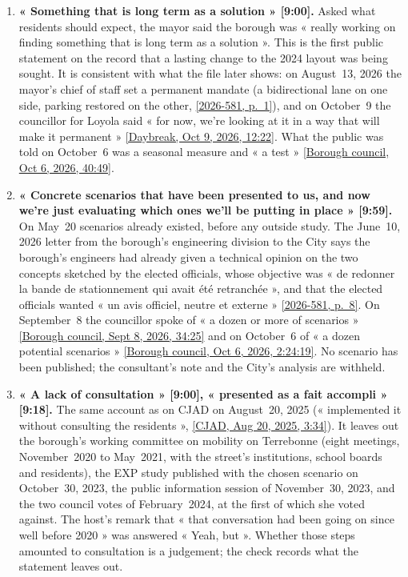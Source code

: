 \documentclass[11pt,letterpaper]{article}
\newcommand{\repourl}{https://github.com/OpenMobilityData/Terrebonne-open-sources}
\newcommand{\pagesurl}{https://openmobilitydata.github.io/Terrebonne-access-requests}
\newcommand{\cliptime}[1]{\textsf{\small[#1]}}
\newcommand{\pgl}[2]{\href{\pagesurl/2026-581/raw/01_emails_mandate_counts.pdf\#page=#1}{\textsf{\small[2026-581, p.~#2]}}}
\newcommand{\pg}[1]{\pgl{#1}{#1}}
\newcommand{\octsix}[2]{\href{\repourl/blob/main/2026-10-06-borough-council/derived/#1}{\textsf{\small[Borough council, Oct 6, 2026, #2]}}}
\newcommand{\septeight}[1]{\href{\repourl/blob/main/2026-09-08-borough-council/}{\textsf{\small[Borough council, Sept 8, 2026, #1]}}}
\newcommand{\dbocttime}[1]{\href{\repourl/blob/main/2026-cbc-daybreak-interview/}{\textsf{\small[Daybreak, Oct 9, 2026, #1]}}}
\newcommand{\cjad}[1]{\href{\repourl/blob/main/2025-08-20-cjad-valenzuela/derived/2025-08-20_CJAD_Valenzuela_transcript_en.md}{\textsf{\small[CJAD, Aug 20, 2025, #1]}}}
\begin{document}
\begin{enumerate}[nosep]
\item \textbf{« Something that is long term as a solution » \cliptime{9:00}.} Asked what residents should expect, the mayor said the borough was « really working on finding something that is long term as a solution ». This is the first public statement on the record that a lasting change to the 2024 layout was being sought. It is consistent with what the file later shows: on August~13, 2026 the mayor's chief of staff set a permanent mandate (a bidirectional lane on one side, parking restored on the other, \pg{1}), and on October~9 the councillor for Loyola said « for now, we're looking at it in a way that will make it permanent » \dbocttime{12:22}. What the public was told on October~6 was a seasonal measure and « a test » \octsix{2026-10-06_01.md}{40:49}.
\item \textbf{« Concrete scenarios that have been presented to us, and now we're just evaluating which ones we'll be putting in place » \cliptime{9:59}.} On May~20 scenarios already existed, before any outside study. The June~10, 2026 letter from the borough's engineering division to the City says the borough's engineers had already given a technical opinion on the two concepts sketched by the elected officials, whose objective was « de redonner la bande de stationnement qui avait été retranchée », and that the elected officials wanted « un avis officiel, neutre et externe » \pg{8}. On September~8 the councillor spoke of « a dozen or more of scenarios » \septeight{34:25} and on October~6 of « a dozen potential scenarios » \octsix{2026-10-06_05.md}{2:24:19}. No scenario has been published; the consultant's note and the City's analysis are withheld.
\item \textbf{« A lack of consultation » \cliptime{9:00}, « presented as a fait accompli » \cliptime{9:18}.} The same account as on CJAD on August~20, 2025 (« implemented it without consulting the residents », \cjad{3:34}). It leaves out the borough's working committee on mobility on Terrebonne (eight meetings, November~2020 to May~2021, with the street's institutions, school boards and residents), the EXP study published with the chosen scenario on October~30, 2023, the public information session of November~30, 2023, and the two council votes of February~2024, at the first of which she voted against. The host's remark that « that conversation had been going on since well before 2020 » was answered « Yeah, but ». Whether those steps amounted to consultation is a judgement; the check records what the statement leaves out.

\end{enumerate}
\end{document}
